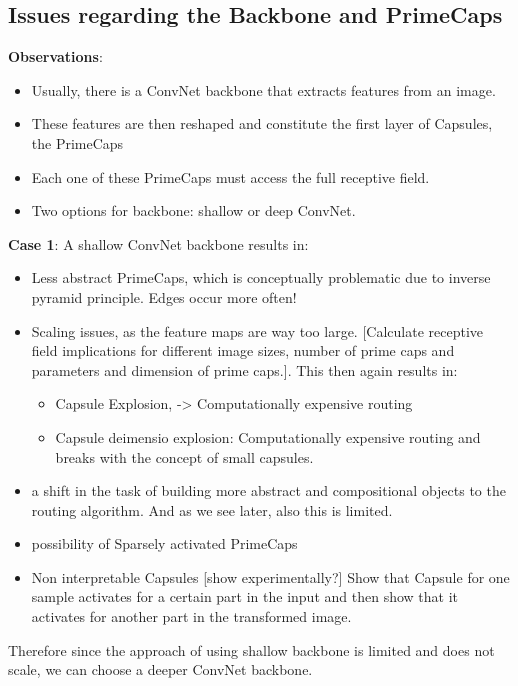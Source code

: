 \documentclass{article}
\begin{document}
\subsection{Issues regarding the Backbone and PrimeCaps}
\textbf{Observations}:
\begin{itemize}
	\item Usually, there is a ConvNet backbone that extracts features from an image.
	\item These features are then reshaped and constitute the first layer of Capsules, the PrimeCaps
	\item Each one of these PrimeCaps must access the full receptive field.
	\item Two options for backbone: shallow or deep ConvNet.
\end{itemize}
\textbf{Case 1}: A shallow ConvNet backbone results in:
\begin{itemize}
	\item Less abstract PrimeCaps, which is conceptually problematic due to inverse pyramid principle. Edges occur more often! 
	\item Scaling issues, as the feature maps are way too large.
	[Calculate receptive field implications for different image sizes, number of prime caps and parameters and dimension of prime caps.]. This then again results in:
	\begin{itemize}
		\item Capsule Explosion, -> Computationally expensive routing %
		\item Capsule deimensio explosion: Computationally expensive routing and breaks with the concept of small capsules.
	\end{itemize}
	\item a shift in the task of building more abstract and compositional objects to the routing algorithm. And as we see later, also this is limited.
	\item possibility of Sparsely activated PrimeCaps
	\item Non interpretable Capsules [show experimentally?] Show that Capsule for one sample activates for a certain part in the input and then show that it activates for another part in the transformed image.
\end{itemize}
Therefore since the approach of using shallow backbone is limited and does not scale, we can choose a deeper ConvNet backbone. \\
\end{document}
